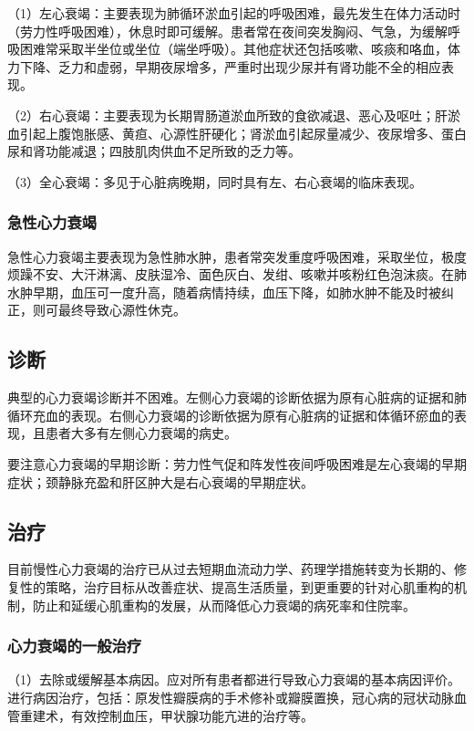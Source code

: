 （1）左心衰竭：主要表现为肺循环淤血引起的呼吸困难，最先发生在体力活动时（劳力性呼吸困难），休息时即可缓解。患者常在夜间突发胸闷、气急，为缓解呼吸困难常采取半坐位或坐位（端坐呼吸）。其他症状还包括咳嗽、咳痰和咯血，体力下降、乏力和虚弱，早期夜尿增多，严重时出现少尿并有肾功能不全的相应表现。

（2）右心衰竭：主要表现为长期胃肠道淤血所致的食欲减退、恶心及呕吐；肝淤血引起上腹饱胀感、黄疸、心源性肝硬化；肾淤血引起尿量减少、夜尿增多、蛋白尿和肾功能减退；四肢肌肉供血不足所致的乏力等。

（3）全心衰竭：多见于心脏病晚期，同时具有左、右心衰竭的临床表现。

\subsubsection{急性心力衰竭}

急性心力衰竭主要表现为急性肺水肿，患者常突发重度呼吸困难，采取坐位，极度烦躁不安、大汗淋漓、皮肤湿冷、面色灰白、发绀、咳嗽并咳粉红色泡沫痰。在肺水肿早期，血压可一度升高，随着病情持续，血压下降，如肺水肿不能及时被纠正，则可最终导致心源性休克。

\subsection{诊断}

典型的心力衰竭诊断并不困难。左侧心力衰竭的诊断依据为原有心脏病的证据和肺循环充血的表现。右侧心力衰竭的诊断依据为原有心脏病的证据和体循环瘀血的表现，且患者大多有左侧心力衰竭的病史。

要注意心力衰竭的早期诊断：劳力性气促和阵发性夜间呼吸困难是左心衰竭的早期症状；颈静脉充盈和肝区肿大是右心衰竭的早期症状。

\subsection{治疗}

目前慢性心力衰竭的治疗已从过去短期血流动力学、药理学措施转变为长期的、修复性的策略，治疗目标从改善症状、提高生活质量，到更重要的针对心肌重构的机制，防止和延缓心肌重构的发展，从而降低心力衰竭的病死率和住院率。

\subsubsection{心力衰竭的一般治疗}

（1）去除或缓解基本病因。应对所有患者都进行导致心力衰竭的基本病因评价。进行病因治疗，包括：原发性瓣膜病的手术修补或瓣膜置换，冠心病的冠状动脉血管重建术，有效控制血压，甲状腺功能亢进的治疗等。


